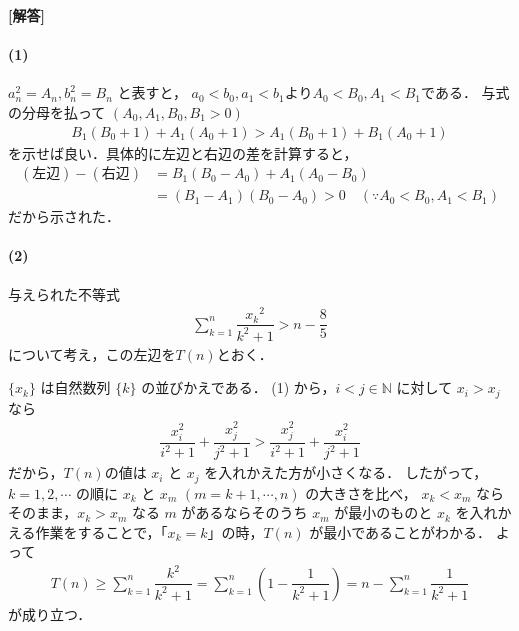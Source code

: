 \documentclass[../../main.tex]{subfiles}
\begin{document}
\begin{oframed}
  
\end{oframed}

{\bf [解答]}

\paragraph{(1)}

$a_n^2 = A_n, b_n^2 =B_n$ と表すと，
$a_0<b_0, a_1<b_1$より$A_0 < B_0, A_1 < B_1$である．
与式の分母を払って $(A_0, A_1, B_0, B_1 > 0)$
\begin{align}
  B_1 (B_0 + 1) + A_1 (A_0 + 1) > A_1 (B_0 + 1) + B_1 (A_0 + 1)
\end{align}
を示せば良い．具体的に左辺と右辺の差を計算すると，
\begin{align}
  (\text{左辺}) - (\text{右辺}) &= B_1 (B_0 - A_0) + A_1 (A_0 - B_0) \\
  &= (B_1 - A_1) (B_0 - A_0) > 0 \quad (\because A_0 < B_0, A_1 < B_1)
\end{align}
だから示された．

\paragraph{(2)}

与えられた不等式
\begin{align}
  \sum_{k=1}^n\dfrac{{x_k}^2}{k^2+1}>n-\dfrac{8}{5} \label{eq:1}
\end{align}
について考え，この左辺を$T(n)$とおく．

$\{x_k\}$ は自然数列 $\{k\}$ の並びかえである．
(1) から，$i < j \in \mathbb{N}$ に対して $x_i > x_j$ なら
\begin{align}
  \dfrac{x_i^2}{i^2+1} + \dfrac{x_j^2}{j^2+1} > \dfrac{x_j^2}{i^2+1} + \dfrac{x_i^2}{j^2+1} \label{eq:2}
\end{align}
だから，$T(n)$の値は $x_i$ と $x_j$ を入れかえた方が小さくなる．
したがって，$k = 1, 2, \cdots$ の順に $x_k$ と $x_m$ $(m = k+1, \cdots, n)$ の大きさを比べ，
$x_k < x_m$ ならそのまま，$x_k > x_m$ なる $m$ があるならそのうち $x_m$ が最小のものと $x_k$ を入れかえる作業をすることで，「$x_k = k$」の時，$T(n)$ が最小であることがわかる．
よって
\begin{align}
  T(n)
  \ge \sum_{k=1}^n \dfrac{k^2}{k^2+1}
  = \sum_{k=1}^n \left( 1 - \dfrac{1}{k^2+1} \right)
  = n - \sum_{k=1}^n \dfrac{1}{k^2+1} \label{eq:3}
\end{align}
が成り立つ．
\end{document}
